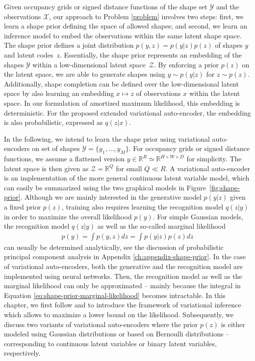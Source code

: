 Given occupancy grids or signed distance functions of
the shape set $\mathcal{Y}$ and the observations $\mathcal{X}$,
our approach to Problem \ref{problem} involves two steps:
first, we learn a shape prior defining the space of allowed shapes;
and second, we learn an inference model to embed the observations
within the same latent shape space.
The shape prior defines a joint distribution $p(y, z) = p(y | z) p(z)$
of shapes $y$ and latent codes~$z$. Essentially, the shape prior
represents an embedding of the shapes $\mathcal{Y}$
within a low-dimensional latent space~$\mathcal{Z}$. By enforcing a 
prior $p(z)$ on the latent space, we are able to generate shapes
using $y \sim p(y|z)$ for $z \sim p(z)$. Additionally, shape completion
can be defined over the low-dimensional latent space by also learning
an embedding $x \mapsto z$ of observations $x$ within the latent space.
In our formulation of amortized maximum likelihood, this embedding is deterministic.
For the proposed extended variational auto-encoder, the embedding is also probabilistic,
\ie expressed as $q(z | x)$.

In the following, we intend to learn the shape prior
using variational auto-encoders on set of shapes $\mathcal{Y} = \{y_1, \ldots, y_M\}$.
For occupancy grids or signed distance functions, we assume a flattened version
$y \in \mathbb{R}^R \simeq \mathbb{R}^{H \times W \times D}$ for simplicity.
The latent space is then given as $\mathcal{Z} = \mathbb{R}^Q$ for 
small $Q \ll R$.
A variational auto-encoder is an implementation of the more general
continuous latent variable model, which can easily be summarized using
the two graphical models in Figure~\ref{fig:shape-prior}. Although we are
mainly interested in the generative model $p(y | z)$ given a fixed prior $p(z)$,
training also requires learning the recognition model $q(z | y)$
in order to maximize the overall likelihood $p(y)$. For simple Gaussian models,
the recognition model $q(z | y)$ as well as the so-called marginal likelihood
\begin{align}
  p(y) = \int p(y, z) dz = \int p(y | z)p(z) dz
  \label{eq:shape-prior-marginal-likelihood}
\end{align}
can usually be determined analytically,
\eg see the discussion of probabilistic principal component analysis in
Appendix \ref{ch:appendix-shape-prior}. In the case of variational auto-encoders,
both the generative and the recognition model are implemented using neural networks.
Then, the recognition model as well as the marginal likelihood can only be approximated
-- mainly because the integral in Equation \eqref{eq:shape-prior-marginal-likelihood}
becomes intractable. In this chapter, we first follow \cite{BleiKucukelbirMcAuliffe:2016}
and \cite{Doersch:2016}
to introduce the framework of variational inference which allows to maximize a
lower bound on the likelihood. Subsequently, we discuss two variants of variational
auto-encoders where the prior $p(z)$ is either modeled using Gaussian distributions
or based on Bernoulli distributions -- corresponding to continuous latent variables
or binary latent variables, respectively.

